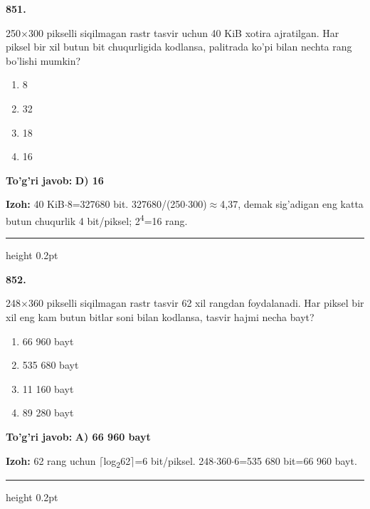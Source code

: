 \documentclass[10pt,a4paper,oneside]{article}
\begin{document}
\noindent\textbf{\color{ink}851.}
\par
250\ensuremath{\times}300 pikselli siqilmagan rastr tasvir uchun 40 KiB xotira ajratilgan. Har piksel bir xil butun bit chuqurligida kodlansa, palitrada ko'pi bilan nechta rang bo'lishi mumkin?
\begin{enumerate}[label=\Alph*),leftmargin=9mm]
\item 8
\item 32
\item 18
\item 16
\end{enumerate}
\begin{tcolorbox}[enhanced,breakable,colback=teal!4,colframe=teal!50!black,boxrule=0.5pt,arc=1.1mm,left=3mm,right=3mm,top=1.7mm,bottom=1.7mm,before skip=2mm,after skip=2mm]
\textbf{\color{teal}To'g'ri javob:} \textbf{D) 16}
\par\smallskip
\textbf{Izoh:} 40 KiB\ensuremath{\cdot}8=327680 bit. 327680/(250\ensuremath{\cdot}300)\ensuremath{\approx}4,37, demak sig'adigan eng katta butun chuqurlik 4 bit/piksel; 2\textsuperscript{4}=16 rang.
\end{tcolorbox}
\vspace{2mm}\hrule height 0.2pt \vspace{3mm}

\noindent\textbf{\color{ink}852.}
\par
248\ensuremath{\times}360 pikselli siqilmagan rastr tasvir 62 xil rangdan foydalanadi. Har piksel bir xil eng kam butun bitlar soni bilan kodlansa, tasvir hajmi necha bayt?
\begin{enumerate}[label=\Alph*),leftmargin=9mm]
\item 66 960 bayt
\item 535 680 bayt
\item 11 160 bayt
\item 89 280 bayt
\end{enumerate}
\begin{tcolorbox}[enhanced,breakable,colback=teal!4,colframe=teal!50!black,boxrule=0.5pt,arc=1.1mm,left=3mm,right=3mm,top=1.7mm,bottom=1.7mm,before skip=2mm,after skip=2mm]
\textbf{\color{teal}To'g'ri javob:} \textbf{A) 66 960 bayt}
\par\smallskip
\textbf{Izoh:} 62 rang uchun \ensuremath{\lceil}log\textsubscript{2}62\ensuremath{\rceil}=6 bit/piksel. 248\ensuremath{\cdot}360\ensuremath{\cdot}6=535 680 bit=66 960 bayt.
\end{tcolorbox}
\vspace{2mm}\hrule height 0.2pt \vspace{3mm}
\end{document}
